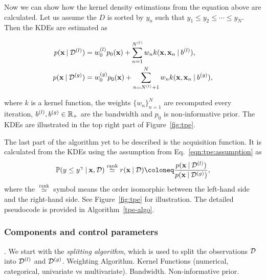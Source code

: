 Now we can show how the kernel density estimations from the equation above are calculated. Let us assume the $D$ is sorted by $y_n$ such that $y_1 \leq y_2 \leq \cdots \leq y_N$. Then the KDEs are estimated as


\begin{equation}
    \begin{split}
   p(\mathbf{x} \:\vert\: \mathcal{D}^{(l)}) &= w_0^{(l)} p_0(\mathbf{x}) + \sum_{n=1}^{N^{(l)}}w_n k(\mathbf{x},\mathbf{x}_n \:\vert\: b^{(l)}), \\
   p(\mathbf{x} \:\vert\: \mathcal{D}^{(g)}) &= w_0^{(g)} p_0(\mathbf{x}) + \sum_{n=N^{(l)}+1}^{N}w_n k(\mathbf{x},\mathbf{x}_n \:\vert\: b^{(g)}),
    \end{split}
    \label{eqn:tpe:kdes}
\end{equation}

where $k$ is a kernel function, the weights $\{ w_n \}_{n=1}^N$ are recomputed every iteration, $b^{(l)},b^{(g)} \in \mathbb{R}_+$ are the bandwidth and $p_0$ is non-informative prior. The KDEs are illustrated in the top right part of Figure~\ref{fig:tpe}.

The last part of the algorithm yet to be described is the acquisition function. It is calculated from the KDEs using the assumption from Eq.~\ref{eqn:tpe:assumption} as
\[
\mathbb{P}(y \leq y^\gamma \given \mathbf{x},\mathcal{D}) \overset{\text{rank}}{\simeq} r(\mathbf{x} \given \mathcal{D}) \coloneq  \frac{p(\mathbf{x} \given \mathcal{D}^{(l)})}{p(\mathbf{x} \given \mathcal{D}^{(g)})} ,
\]
where the $\overset{\text{rank}}{\simeq}$ symbol means the order isomorphic between the left-hand side and the right-hand side. See Figure~\ref{fig:tpe} for illustration. The detailed pseudocode is provided in Algorithm~\ref{tpe-algo}.



\subsubsection{Components and control parameters}
. We start with the \emph{splitting algorithm}, which is used to split the observations $\mathcal{D}$ into $\mathcal{D}^{(l)}$ and $\mathcal{D}^{(g)}$. Weighting Algorithm. Kernel Functions (numerical, categorical, univariate vs multivariate). Bandwidth. Non-informative prior. 

